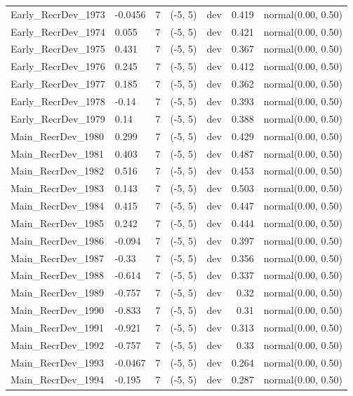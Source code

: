 \documentclass[
]{scrartcl}
\begin{document}
\begin{landscape}
\begin{longtable}{llrllrl}
Early\_RecrDev\_1973 & -0.0456 & 7 & (-5, 5) & dev & 0.419 & normal(0.00, 0.50) \\ 
Early\_RecrDev\_1974 & 0.055 & 7 & (-5, 5) & dev & 0.421 & normal(0.00, 0.50) \\ 
Early\_RecrDev\_1975 & 0.431 & 7 & (-5, 5) & dev & 0.367 & normal(0.00, 0.50) \\ 
Early\_RecrDev\_1976 & 0.245 & 7 & (-5, 5) & dev & 0.412 & normal(0.00, 0.50) \\ 
Early\_RecrDev\_1977 & 0.185 & 7 & (-5, 5) & dev & 0.362 & normal(0.00, 0.50) \\ 
Early\_RecrDev\_1978 & -0.14 & 7 & (-5, 5) & dev & 0.393 & normal(0.00, 0.50) \\ 
Early\_RecrDev\_1979 & 0.14 & 7 & (-5, 5) & dev & 0.388 & normal(0.00, 0.50) \\ 
Main\_RecrDev\_1980 & 0.299 & 7 & (-5, 5) & dev & 0.429 & normal(0.00, 0.50) \\ 
Main\_RecrDev\_1981 & 0.403 & 7 & (-5, 5) & dev & 0.487 & normal(0.00, 0.50) \\ 
Main\_RecrDev\_1982 & 0.516 & 7 & (-5, 5) & dev & 0.453 & normal(0.00, 0.50) \\ 
Main\_RecrDev\_1983 & 0.143 & 7 & (-5, 5) & dev & 0.503 & normal(0.00, 0.50) \\ 
Main\_RecrDev\_1984 & 0.415 & 7 & (-5, 5) & dev & 0.447 & normal(0.00, 0.50) \\ 
Main\_RecrDev\_1985 & 0.242 & 7 & (-5, 5) & dev & 0.444 & normal(0.00, 0.50) \\ 
Main\_RecrDev\_1986 & -0.094 & 7 & (-5, 5) & dev & 0.397 & normal(0.00, 0.50) \\ 
Main\_RecrDev\_1987 & -0.33 & 7 & (-5, 5) & dev & 0.356 & normal(0.00, 0.50) \\ 
Main\_RecrDev\_1988 & -0.614 & 7 & (-5, 5) & dev & 0.337 & normal(0.00, 0.50) \\ 
Main\_RecrDev\_1989 & -0.757 & 7 & (-5, 5) & dev & 0.32 & normal(0.00, 0.50) \\ 
Main\_RecrDev\_1990 & -0.833 & 7 & (-5, 5) & dev & 0.31 & normal(0.00, 0.50) \\ 
Main\_RecrDev\_1991 & -0.921 & 7 & (-5, 5) & dev & 0.313 & normal(0.00, 0.50) \\ 
Main\_RecrDev\_1992 & -0.757 & 7 & (-5, 5) & dev & 0.33 & normal(0.00, 0.50) \\ 
Main\_RecrDev\_1993 & -0.0467 & 7 & (-5, 5) & dev & 0.264 & normal(0.00, 0.50) \\ 
Main\_RecrDev\_1994 & -0.195 & 7 & (-5, 5) & dev & 0.287 & normal(0.00, 0.50) \\ 

\end{longtable}
\end{landscape}
\end{document}
